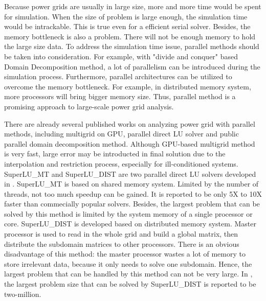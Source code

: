 \documentclass{sig-alternate}
\begin{document}
	Because power grids are usually in large size, more and more time would be
	spent for simulation. When the size of problem is large enough, the simulation time would be intrackable. This is true even
	for a efficient serial solver.
	Besides, the memory bottleneck is also a problem. There will not be enough memory to hold the large size data. To address the
	simulation time issue, parallel methods should be taken into consideration. For example, with "divide and
	conquer" based Domain Decomposition method, a lot of parallelism can be introduced during the simulation process. Furthermore,
	parallel architectures can be utilized to overcome the memory bottleneck. For example, in distributed memory system, more 
	processors will bring bigger memory size. Thus, parallel method is a 
	promising approach to large-scale power grid analysis. 

	There are already several published works on analyzing power grid with parallel methods, including multigrid on 
	GPU\cite{Zhuofeng}, parallel direct LU 
	solver\cite{Super_LU_website} and public parallel domain decomposition method\cite{PETSC_website, kaisun, voronov}. Although 
	GPU-based multigrid method\cite{Zhuofeng} is very fast, large error may be
	introducted in final solution due to the interpolation and restriction
	process, especially for ill-conditioned systems. SuperLU\_MT and SuperLU\_DIST are two parallel direct LU 
	solvers developed in \cite{Super_LU_website}. SuperLU\_MT is 
	based on shared memory system. Limited by the number of threads, not too much speedup can be gained. 
	It is reported to be only 5X to 10X faster than commecially popular solvers\cite{Super_LU_website}. Besides, the largest 
	problem that can be solved by this method is limited by the system memory of a single processor or core. SuperLU\_DIST 
	is developed based on distributed memory system. Master processor is used to read in the whole grid and build a global 
	matrix, then distribute the subdomain matrices to other processors. 
	There is an obvious disadvantage of this method: the master processor wastes a lot of memory to store irrelevant data, because 
	it only needs to solve one subdomain. Hence, the largest problem that can be handled by this method can not be very large. In 
	\cite{Super_LU_website}, the largest problem size that can be solved by SuperLU\_DIST is reported to be two-million.
\end{document}
